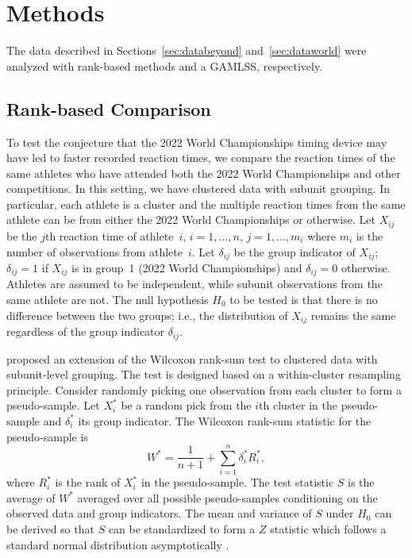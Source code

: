 \documentclass[12pt, letterpaper]{article}
\begin{document}
\section{Methods} \label{sec:methods}

The data described in Sections~\ref{sec:databeyond} and~\ref{sec:dataworld} were
analyzed with rank-based methods and a GAMLSS, respectively.


\subsection{Rank-based Comparison}\label{sec:rank}


To test the conjecture that the 2022 World Championships timing device may have 
led to faster recorded reaction times, we compare the reaction times of the same
athletes who have attended both the 2022 World Championships and other 
competitions. 
In this setting, we have clustered data with subunit grouping. In particular,
each athlete is a cluster and the multiple reaction times from the same athlete
can be from either the 2022 World Championships or otherwise.
Let $X_{ij}$ be the $j$th reaction time of athlete~$i$, $i = 1, \ldots, n$,
$j = 1, \ldots, m_i$ where $m_i$ is the number of observations from
athlete~$i$. Let $\delta_{ij}$ be the group indicator of $X_{ij}$; $\delta_{ij}
= 1$ if $X_{ij}$ is in group~1 (2022 World Championships) and $\delta_{ij} = 0$ 
otherwise. Athletes are
assumed to be independent, while subunit observations from the same athlete are
not. The null hypothesis $H_0$ to be tested is that there is no difference
between the two groups; i.e., the distribution of $X_{ij}$ remains the same
regardless of the group indicator $\delta_{ij}$.


\citet{datta2005rank} proposed an extension of the Wilcoxon rank-sum test to
clustered data with subunit-level grouping. The test is designed based on a
within-cluster resampling principle. Consider randomly picking one observation
from each cluster to form a pseudo-sample. Let $X_i^*$ be a random pick from the
$i$th cluster in the pseudo-sample and $\delta_i^*$ its group indicator. The
Wilcoxon rank-sum statistic for the pseudo-sample is
\[
W^* = \frac{1}{n + 1} + \sum_{i=1}^{n} \delta_{i}^{*} R_{i}^{*},
\]
where $R_{i}^{*}$ is the rank of $X_{i}^{*}$ in the pseudo-sample.
The test statistic $S$ is the average of $W^*$ averaged over all possible
pseudo-samples conditioning on the observed data and group indicators.
The mean and variance of $S$ under $H_0$ can be derived so that $S$ can be
standardized to form a $Z$ statistic which follows a standard normal distribution
asymptotically \citep[p.910]{datta2005rank}.
\end{document}
